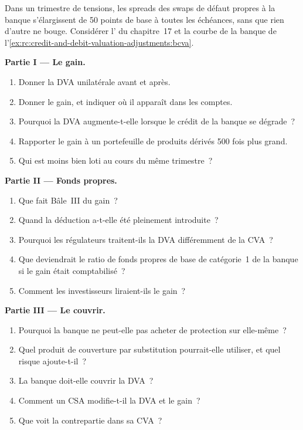 \begin{problem}\label{pb:rc:credit-and-debit-valuation-adjustments:1}
Dans un trimestre de tensions, les spreads des swaps de défaut propres à la banque s'élargissent de 50 points de base à
toutes les échéances, sans que rien d'autre ne bouge. Considérer l' du chapitre~17 et la courbe de la banque de
l'\cref{ex:rc:credit-and-debit-valuation-adjustments:bcva}.

\medskip\noindent\textbf{Partie I --- Le gain.}
\begin{enumerate}
\item Donner la DVA unilatérale avant et après.
\item Donner le gain, et indiquer où il apparaît dans les comptes.
\item Pourquoi la DVA augmente-t-elle lorsque le crédit de la banque se dégrade~?
\item Rapporter le gain à un portefeuille de produits dérivés 500 fois plus grand.
\item Qui est moins bien loti au cours du même trimestre~?
\end{enumerate}

\medskip\noindent\textbf{Partie II --- Fonds propres.}
\begin{enumerate}[resume]
\item Que fait Bâle~III du gain~?
\item Quand la déduction a-t-elle été pleinement introduite~?
\item Pourquoi les régulateurs traitent-ils la DVA différemment de la CVA~?
\item Que deviendrait le ratio de fonds propres de base de catégorie~1 de la banque si le gain était comptabilisé~?
\item Comment les investisseurs liraient-ils le gain~?
\end{enumerate}

\medskip\noindent\textbf{Partie III --- Le couvrir.}
\begin{enumerate}[resume]
\item Pourquoi la banque ne peut-elle pas acheter de protection sur elle-même~?
\item Quel produit de couverture par substitution pourrait-elle utiliser, et quel risque ajoute-t-il~?
\item La banque doit-elle couvrir la DVA~?
\item Comment un CSA modifie-t-il la DVA et le gain~?
\item Que voit la contrepartie dans sa CVA~?
\end{enumerate}


\end{problem}
